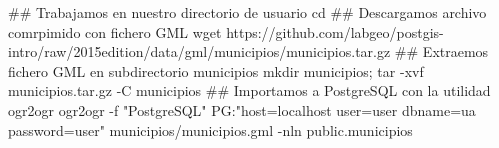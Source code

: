 \lstset{caption=Importación de estancias,label=bash:importarMunicipios}
\begin{bash}
## Trabajamos en nuestro directorio de usuario
cd
## Descargamos archivo comrpimido con fichero GML
wget https://github.com/labgeo/postgis-intro/raw/2015edition/data/gml/municipios/municipios.tar.gz
## Extraemos fichero GML en subdirectorio municipios
mkdir municipios; tar -xvf municipios.tar.gz -C municipios
## Importamos a PostgreSQL con la utilidad ogr2ogr
ogr2ogr -f "PostgreSQL" PG:"host=localhost user=user dbname=ua password=user" municipios/municipios.gml -nln public.municipios
\end{bash}
